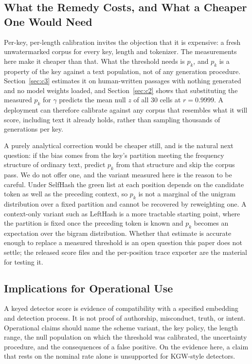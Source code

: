 \documentclass[conference]{IEEEtran}
\begin{document}
\subsection{What the Remedy Costs, and What a Cheaper One Would Need}
\label{sec:cheaper}

Per-key, per-length calibration invites the objection that it is expensive: a
fresh unwatermarked corpus for every key, length and tokenizer. The measurements
here make it cheaper than that. What the threshold needs is $p_k$, and $p_k$ is a
property of the key against a text population, not of any generation procedure.
Section~\ref{sec:c3} estimates it on human-written passages with nothing
generated and no model weights loaded, and Section~\ref{sec:c2} shows that
substituting the measured $p_k$ for $\gamma$ predicts the mean null $z$ of all 30
cells at $r=0.9999$. A deployment can therefore calibrate against any corpus that
resembles what it will score, including text it already holds, rather than
sampling thousands of generations per key.

A purely analytical correction would be cheaper still, and is the natural next
question: if the bias comes from the key's partition meeting the frequency
structure of ordinary text, predict $p_k$ from that structure and skip the corpus
pass. We do not offer one, and the variant measured here is the reason to be
careful. Under SelfHash the green list at each position depends on the candidate
token as well as the preceding context, so $p_k$ is not a marginal of the
unigram distribution over a fixed partition and cannot be recovered by reweighting
one. A context-only variant such as LeftHash is a more tractable starting point,
where the partition is fixed once the preceding token is known and $p_k$ becomes
an expectation over the bigram distribution. Whether that estimate is accurate
enough to replace a measured threshold is an open question this paper does not
settle; the released score files and the per-position trace exporter are the
material for testing it.

\subsection{Implications for Operational Use}

A keyed detector score is evidence of compatibility with a specified embedding
and detection process. It is not proof of authorship, misconduct, truth, or
intent. Operational claims should name the scheme variant, the key policy, the
length range, the null population on which the threshold was calibrated, the
uncertainty procedure, and the consequences of a false positive. On the evidence
here, a claim that rests on the nominal rate alone is unsupported for KGW-style
detectors.
\end{document}
